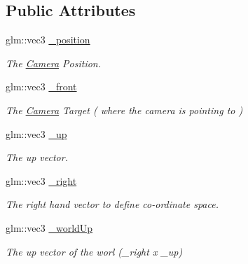 \subsection*{Public Attributes}
\begin{DoxyCompactItemize}
\item 
\hypertarget{class_camera_a0a931ed2051befaad1f482b3b5e98ca0}{}\label{class_camera_a0a931ed2051befaad1f482b3b5e98ca0} 
glm\+::vec3 \hyperlink{class_camera_a0a931ed2051befaad1f482b3b5e98ca0}{\+\_\+position}
\begin{DoxyCompactList}\small\item\em The \hyperlink{class_camera}{Camera} Position. \end{DoxyCompactList}\item 
\hypertarget{class_camera_ac610e748840c4b70c9081c2d68df2e8d}{}\label{class_camera_ac610e748840c4b70c9081c2d68df2e8d} 
glm\+::vec3 \hyperlink{class_camera_ac610e748840c4b70c9081c2d68df2e8d}{\+\_\+front}
\begin{DoxyCompactList}\small\item\em The \hyperlink{class_camera}{Camera} Target ( where the camera is pointing to ) \end{DoxyCompactList}\item 
\hypertarget{class_camera_a323a698e4c5773ee3ec380851b145e2d}{}\label{class_camera_a323a698e4c5773ee3ec380851b145e2d} 
glm\+::vec3 \hyperlink{class_camera_a323a698e4c5773ee3ec380851b145e2d}{\+\_\+up}
\begin{DoxyCompactList}\small\item\em The up vector. \end{DoxyCompactList}\item 
\hypertarget{class_camera_a4c556280ed181d8589c28eec7ebebb49}{}\label{class_camera_a4c556280ed181d8589c28eec7ebebb49} 
glm\+::vec3 \hyperlink{class_camera_a4c556280ed181d8589c28eec7ebebb49}{\+\_\+right}
\begin{DoxyCompactList}\small\item\em The right hand vector to define co-\/ordinate space. \end{DoxyCompactList}\item 
\hypertarget{class_camera_a821cb93133c99177c74ea39339aaa269}{}\label{class_camera_a821cb93133c99177c74ea39339aaa269} 
glm\+::vec3 \hyperlink{class_camera_a821cb93133c99177c74ea39339aaa269}{\+\_\+world\+Up}
\begin{DoxyCompactList}\small\item\em The up vector of the worl (\+\_\+right x \+\_\+up) \end{DoxyCompactList}\item 

\end{DoxyCompactItemize}
